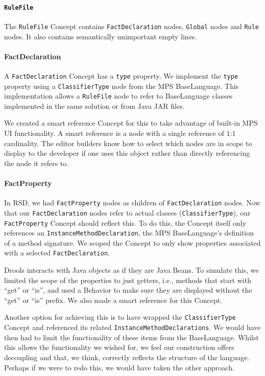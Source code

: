 \paragraph{\texttt{RuleFile}} The \texttt{RuleFile} Concept contains \texttt{FactDeclaration} nodes, \texttt{Global} nodes and \texttt{Rule} nodes.
It also contains semantically unimportant empty lines.

\paragraph{FactDeclaration} A \texttt{FactDeclaration} Concept has a \texttt{type} property.
We implement the \texttt{type} property using a \texttt{ClassifierType} node from the MPS BaseLanguage.
This implementation allows a \texttt{RuleFile} node to refer to BaseLanguage classes implemented in the same solution or from Java JAR files.

We created a smart reference Concept for this to take advantage of built-in MPS UI functionality.
A smart reference is a node with a single reference of 1:1 cardinality.
The editor builders know how to select which nodes are in scope to display to the developer if one uses this object rather than directly referencing the node it refers to.

\paragraph{FactProperty} In RSD, we had \texttt{FactProperty} nodes as children of \texttt{FactDeclaration} nodes.
Now that our \texttt{FactDeclaration} nodes refer to actual classes (\texttt{ClassifierType}), our \texttt{FactProperty} Concept should reflect this.
To do this, the Concept itself only references an \texttt{InstanceMethodDeclaration}, the MPS BaseLanguage's definition of a method signature.
We scoped the Concept to only show properties associated with a selected \texttt{FactDeclaration}.

Drools interacts with Java objects as if they are Java Beans.
To simulate this, we limited the scope of the properties to just getters, i.e., methods that start with ``get'' or ``is'', and used a Behavior to make sure they are displayed without the ``get'' or ``is'' prefix.
We also made a smart reference for this Concept.

Another option for achieving this is to have wrapped the \texttt{ClassifierType} Concept and referenced its related \texttt{InstanceMethodDeclarations}.
We would have then had to limit the functionality of these items from the BaseLanguage.
Whilst this allows the functionality we wished for, we feel our construction offers decoupling and that, we think, correctly reflects the structure of the language.
Perhaps if we were to redo this, we would have taken the other approach.

